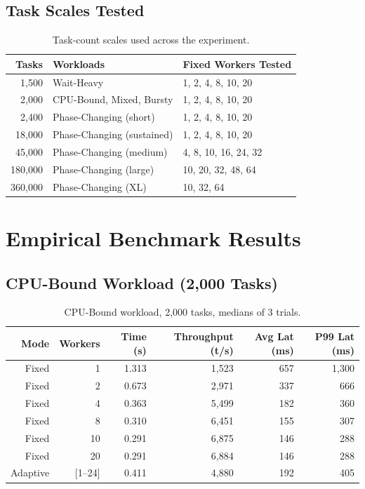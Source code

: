 \documentclass[12pt,a4paper]{article}
\begin{document}
\subsection{Task Scales Tested}

\begin{table}[H]
\centering
\caption{Task-count scales used across the experiment.}
\begin{tabular}{rll}
\toprule
\textbf{Tasks} & \textbf{Workloads} & \textbf{Fixed Workers Tested} \\
\midrule
1,500   & Wait-Heavy                 & 1, 2, 4, 8, 10, 20       \\
2,000   & CPU-Bound, Mixed, Bursty   & 1, 2, 4, 8, 10, 20       \\
2,400   & Phase-Changing (short)     & 1, 2, 4, 8, 10, 20       \\
18,000  & Phase-Changing (sustained) & 1, 2, 4, 8, 10, 20       \\
45,000  & Phase-Changing (medium)    & 4, 8, 10, 16, 24, 32     \\
180,000 & Phase-Changing (large)     & 10, 20, 32, 48, 64       \\
360,000 & Phase-Changing (XL)        & 10, 32, 64               \\
\bottomrule
\end{tabular}
\end{table}

\section{Empirical Benchmark Results}

\subsection{CPU-Bound Workload (2,000 Tasks)}

\begin{table}[H]
\centering
\caption{CPU-Bound workload, 2,000 tasks, medians of 3 trials.}
\begin{tabular}{rrrrrr}
\toprule
\textbf{Mode} & \textbf{Workers} & \textbf{Time (s)}
  & \textbf{Throughput (t/s)} & \textbf{Avg Lat (ms)} & \textbf{P99 Lat (ms)} \\
\midrule
Fixed & 1  & 1.313 & 1,523 & 657 & 1,300 \\
Fixed & 2  & 0.673 & 2,971 & 337 &   666 \\
Fixed & 4  & 0.363 & 5,499 & 182 &   360 \\
Fixed & 8  & 0.310 & 6,451 & 155 &   307 \\
Fixed & 10 & 0.291 & 6,875 & 146 &   288 \\
Fixed & 20 & 0.291 & 6,884 & 146 &   288 \\
\rowcolor{rowblue}
Adaptive & [1--24] & 0.411 & 4,880 & 192 & 405 \\
\bottomrule
\end{tabular}
\label{tab:cpu}
\end{table}
\end{document}
